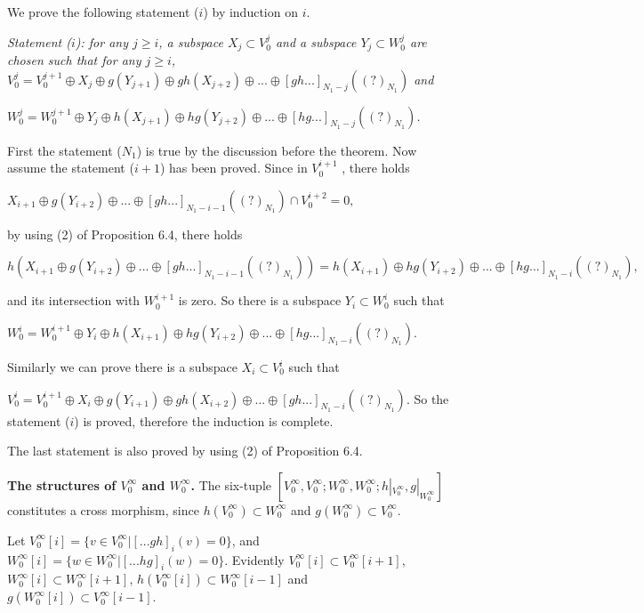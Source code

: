 \def\CTEXPreproc{Created by ctex v0.2.12, don't edit!}\documentclass[11pt]{article}
\begin{document}
\begin{pf} We prove the following statement ($i$) by induction on $i$.

\textit{Statement ($i$): for any $j\geq i$, a subspace $X_j \subset V^j_0$ and a subspace $Y_j \subset W^j_0$ are chosen such that for any
$j\geq i$,$V^j_0 =  V^{j+1}_0 \oplus X_j \oplus g(Y_{j+1})\oplus gh(X_{j+2})\oplus...\oplus [gh...]_{N_1 -j}( (?)_{N_1} )$ and}

\noindent\textit{$W^j_0 =  W^{j+1}_0 \oplus Y_j \oplus h(X_{j+1})\oplus hg(Y_{j+2})\oplus...\oplus [hg...]_{N_1 -j}( (?)_{N_1} )$.}

First the statement ($N_1$) is true by the discussion before the theorem. Now assume the statement ($i+1$) has been proved.
Since in $V^{i+1}_0$ , there holds

$X_{i+1} \oplus g(Y_{i+2 }) \oplus ...\oplus [gh...]_{N_1 -i-1}( (?)_{N_1} ) \cap V^{i+2}_0 =0 ,$

by using (2) of Proposition 6.4, there holds

$h( X_{i+1} \oplus g(Y_{i+2 }) \oplus ...\oplus [gh...]_{N_1 -i-1}( (?)_{N_1} ) )=h( X_{i+1}) \oplus hg(Y_{i+2 }) \oplus ...\oplus [hg...]_{N_1 -i}( (?)_{N_1} )  ,$

 and its intersection with $ W^{i+1}_0   $ is zero.  So there is a subspace
 $Y_i \subset W^i_0  $ such that

 $W^i_0 =  W^{i+1}_0 \oplus Y_i \oplus h(X_{i+1})\oplus hg(Y_{i+2})\oplus...\oplus [hg...]_{N_1 -i}( (?)_{N_1} )$.


Similarly we can prove there is a subspace  $X_i \subset V^i _0 $ such that

 $ V^i_0 =  V^{i+1}_0 \oplus X_i \oplus g(Y_{i+1})\oplus gh(X_{i+2})\oplus...\oplus [gh...]_{N_1 -i}( (?)_{N_1} ) $. So the statement ($i$) is proved, therefore the induction is complete.

 The last statement is also proved by using (2) of Proposition 6.4.
 \\

\end{pf}


\noindent \textbf{The structures of $V^{\infty}_0$ and $W^{\infty}_0 $.}  The six-tuple $ [V^{\infty}_0 , V^{\infty}_0 ; W^{\infty} _0 , W^{\infty}_0 ; h|_{V^{\infty}_0 } , g|_{W^{\infty}_0}  ] $ constitutes a cross  morphism, since $h(V^{\infty}_0 ) \subset W^{\infty}_0 $ and $g ( W^{\infty}_0  )\subset V^{\infty}_0  $.

Let $V^{\infty}_0 [i]=\{ v\in V^{\infty}_0 |  [...gh ]_i (v)=0 \}  $, and  $W^{\infty}_0 [i]=\{ w\in W^{\infty}_0 |  [...hg ]_i (w)=0 \} .  $ Evidently $V^{\infty}_0 [i]\subset V^{\infty}_0 [i+1]   $, $W^{\infty}_0 [i]\subset W^{\infty}_0 [i+1] $,
$ h(V^{\infty}_0 [i]  ) \subset W^{\infty}_0 [i-1]  $ and $ g(W^{\infty}_0 [i]  ) \subset V^{\infty}_0 [i-1]  $.
\end{document}

